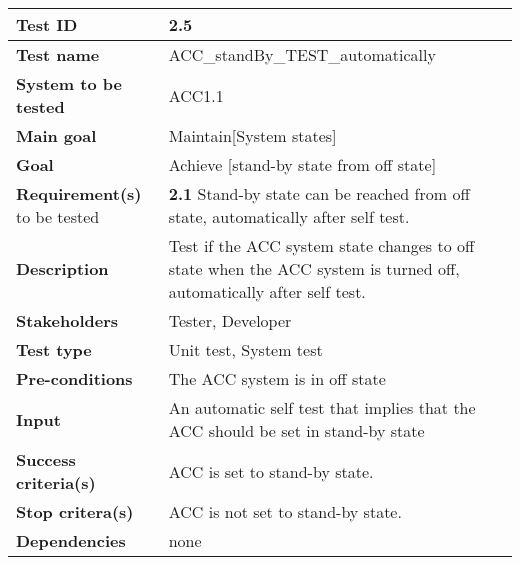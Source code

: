 	\begin{table}[H]
		\begin{tabular}{| p{4cm} | p{10cm} |}
			\hline
			\rowcolor{gray}
			{\bf Test ID} & 2.5 \\ \hline
			{\bf Test name} & ACC\_standBy\_TEST\_automatically\\ \hline
			{\bf System to be tested} & ACC1.1\\ \hline
			{\bf Main goal} & Maintain[System states] \\ \hline
			{\bf Goal} & Achieve [stand-by state from off state] \\ \hline
			{\bf Requirement(s)} to be tested & {\bf 2.1} Stand-by state can be reached 
			from off state, automatically after self test.
			\\ \hline
			{\bf Description} & Test if the ACC system state changes to off state when 
			the ACC system is turned off, automatically after self test. \\ \hline
			{\bf Stakeholders} & Tester, Developer \\ \hline
			{\bf Test type} & Unit test, System test \\ \hline
			{\bf Pre-conditions} & The ACC system is in off state \\ \hline
			{\bf Input} & An automatic self test that implies that the ACC should be set 
			in stand-by state \\ \hline
			{\bf Success criteria(s)} & ACC is set to stand-by state.\\ \hline
			{\bf Stop critera(s)} & ACC is not set to stand-by state. \\ \hline
			{\bf Dependencies} & none \\ \hline
		\end{tabular}
	\end{table}

	

